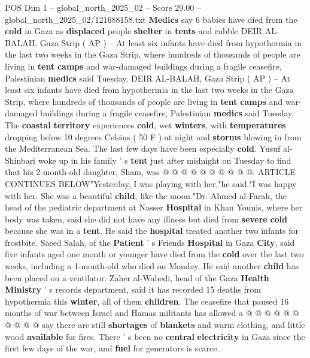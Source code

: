 \begin{textsample}{POS Dim 1 – global\_north\_2025\_02 – Score 29.00 – global\_north\_2025\_02/121688158.txt}  \label{ex:f1_pos_434}
\textbf{Medics} say 6 babies have died from the \textbf{cold} in Gaza as \textbf{displaced} people \textbf{shelter} in \textbf{tents} and rubble DEIR AL-BALAH, Gaza Strip ( AP ) -- At least six infants have died from hypothermia in the last two weeks in the Gaza Strip, where hundreds of thousands of people are living in \textbf{tent} \textbf{camps} and war-damaged buildings during a fragile ceasefire, Palestinian \textbf{medics} said Tuesday.
DEIR AL-BALAH, Gaza Strip ( AP ) -- At least six infants have died from hypothermia in the last two weeks in the Gaza Strip, where hundreds of thousands of people are living in \textbf{tent} \textbf{camps} and war-damaged buildings during a fragile ceasefire, Palestinian \textbf{medics} said Tuesday.
The \textbf{coastal} \textbf{territory} experiences \textbf{cold}, wet \textbf{winters}, with \textbf{temperatures} dropping below 10 degrees Celsius ( 50 F ) at night and \textbf{storms} blowing in from the Mediterranean Sea.
The last few days have been especially \textbf{cold}.
Yusuf al-Shinbari woke up in his family ' s \textbf{tent} just after midnight on Tuesday to find that his 2-month-old daughter, Sham, was @ @ @ @ @ @ @ @ @ @.
ARTICLE CONTINUES BELOW"Yesterday, I was playing with her,"he said."I was happy with her.
She was a beautiful \textbf{child}, like the moon."Dr.
Ahmed al-Farah, the head of the pediatric department at Nasser \textbf{Hospital} in Khan Younis, where her body was taken, said she did not have any illness but died from \textbf{severe} \textbf{cold} because she was in a \textbf{tent}.
He said the \textbf{hospital} treated another two infants for frostbite.
Saeed Salah, of the \textbf{Patient} ' s Friends \textbf{Hospital} in Gaza \textbf{City}, said five infants aged one month or younger have died from the \textbf{cold} over the last two weeks, including a 1-month-old who died on Monday.
He said another \textbf{child} has been placed on a ventilator.
Zaher al-Wahedi, head of the Gaza \textbf{Health} \textbf{Ministry} ' s records department, said it has recorded 15 deaths from hypothermia this \textbf{winter}, all of them \textbf{children}.
The ceasefire that paused 16 months of war between Israel and Hamas militants has allowed a @ @ @ @ @ @ @ @ @ @ say there are still \textbf{shortages} of \textbf{blankets} and warm clothing, and little wood \textbf{available} for fires.
There ' s been no \textbf{central} \textbf{electricity} in Gaza since the first few days of the war, and \textbf{fuel} for generators is scarce.

\end{textsample}
